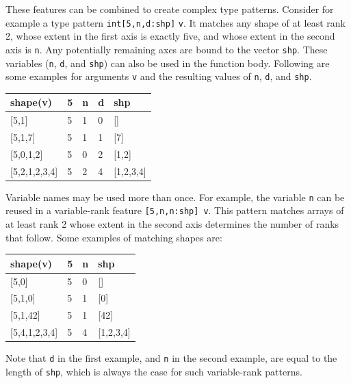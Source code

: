 \documentclass[sigconf,screen]{acmart}
\begin{document}
These features can be combined to create complex type patterns.
Consider for example a type pattern \texttt{int[5,n,d:shp]} \texttt{v}.
It matches any shape of at least rank 2, whose extent in the first axis is exactly five, and whose extent in the second axis is \texttt{n}.
Any potentially remaining axes are bound to the vector \texttt{shp}.
These variables (\texttt{n}, \texttt{d}, and \texttt{shp}) can also be used in the function body.
Following are some examples for arguments \texttt{v} and the resulting values of \texttt{n}, \texttt{d}, and \texttt{shp}.

\begin{table}[!ht]
\ttfamily
\begin{tabular}{lllll}\hline
  shape(v)             & 5 & n & d & shp       \\\hline
  \text{}[5,1]         & 5 & 1 & 0 & []        \\
  \text{}[5,1,7]       & 5 & 1 & 1 & [7]       \\
  \text{}[5,0,1,2]     & 5 & 0 & 2 & [1,2]     \\
  \text{}[5,2,1,2,3,4] & 5 & 2 & 4 & [1,2,3,4] \\\hline
\end{tabular}
\end{table}

Variable names may be used more than once.
For example, the variable \texttt{n} can be reused in a variable-rank feature \texttt{[5,n,n:shp]}~\texttt{v}.
This pattern matches arrays of at least rank 2 whose extent in the second axis determines the number of ranks that follow.
Some examples of matching shapes are:

\begin{table}[!ht]
\ttfamily
\begin{tabular}{llll}\hline
  shape(v)             & 5 & n & shp       \\\hline
  \text{}[5,0]         & 5 & 0 & []        \\
  \text{}[5,1,0]       & 5 & 1 & [0]       \\
  \text{}[5,1,42]      & 5 & 1 & [42]      \\
  \text{}[5,4,1,2,3,4] & 5 & 4 & [1,2,3,4] \\\hline
\end{tabular}
\end{table}

Note that \texttt{d} in the first example, and \texttt{n} in the second example, are equal to the length of \texttt{shp}, which is always the case for such variable-rank patterns.
\end{document}
